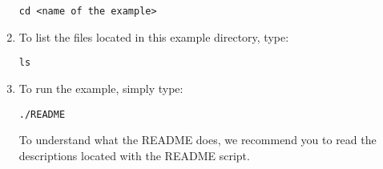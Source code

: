 \begin{enumerate}
\begin{tcolorbox}
\begin{Verbatim}[fontsize=\scriptsize]
cd <name of the example>
\end{Verbatim}
\end{tcolorbox}
\item To list the files located in this example directory, type: 
\begin{tcolorbox}
\begin{Verbatim}[fontsize=\scriptsize]
ls
\end{Verbatim}
\end{tcolorbox}
\item To run the example, simply type: 
\begin{tcolorbox}
\begin{Verbatim}[fontsize=\scriptsize]
./README
\end{Verbatim}
\end{tcolorbox}
To understand what the README does, we recommend you to read the descriptions located with the README script.
\end{enumerate}


